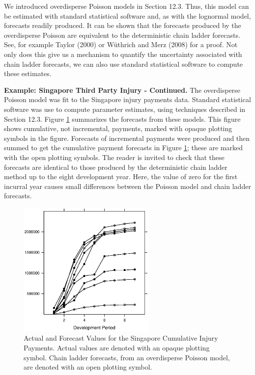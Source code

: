 We introduced overdisperse Poisson models in Section 12.3. Thus,
this model can be estimated with standard statistical software and,
as with the lognormal model, forecasts readily produced. It can be
shown that the forecasts produced by the overdisperse Poisson are
equivalent to the deterministic chain ladder forecasts. See, for
example Taylor (2000) or W\"{u}thrich and Merz (2008) for a proof.
Not only does this give us a mechanism to quantify the uncertainty
associated with chain ladder forecasts, we can also use standard
statistical software to compute these estimates.

\linejed

\textbf{Example: Singapore Third Party Injury - Continued.} The
overdisperse Poisson model was fit to the Singapore injury payments
data. Standard statistical software was use to compute parameter
estimates, using techniques described in Section 12.3. Figure
\ref{F19:PoissonCumForecasts} summarizes the forecasts from these
models. This figure shows cumulative, not incremental, payments,
marked with opaque plotting symbols in the figure. Forecasts of
incremental payments were produced and then summed to get the
cumulative payment forecasts in Figure
\ref{F19:PoissonCumForecasts}; these are marked with the open
plotting symbols. The reader is invited to check that these
forecasts are identical to those produced by the deterministic chain
ladder method up to the eight development year. Here, the value of
zero for the first incurral year causes small differences between
the Poisson model and chain ladder forecasts.

\begin{figure}[htp]
    \includegraphics[width=0.6\textwidth]{Chapter19Triangles/F19PoissonCumForecasts.eps}
  \caption{\label{F19:PoissonCumForecasts} Actual and Forecast Values for the Singapore
  Cumulative Injury Payments. Actual values are denoted with an
  opaque plotting symbol. Chain ladder forecasts, from an
  overdisperse Poisson model, are denoted with an open plotting
  symbol.}
\end{figure}

